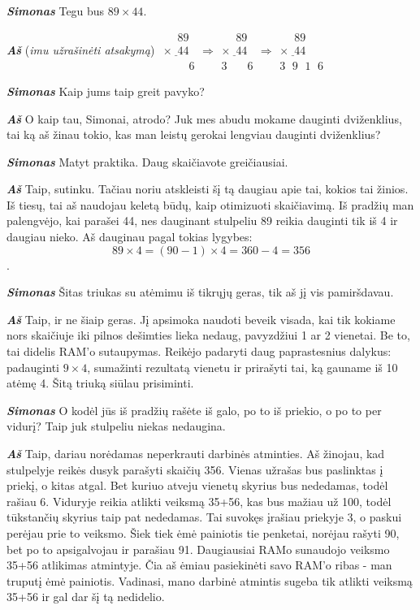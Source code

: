 \documentclass[a4paper]{article}
\newcommand{\say}[1]{\textbf{\textit{#1}}}
\begin{document}
\say{Simonas} Tegu bus $89 \times 44$.

\say{Aš} (\textit{imu užrašinėti atsakymą}) $\begin{array}{c}
\phantom{\times0}89\\
\underline{\times\phantom{0}44}\\
\phantom{\times044}6
\end{array} \Rightarrow 
\begin{array}{c}
\phantom{\times0}89\\
\underline{\times\phantom{0}44}\\
3\phantom{\times44}6
\end{array}\Rightarrow 
\begin{array}{c}
\phantom{\times0}89\\
\underline{\times\phantom{0}44}\\
3\phantom{\cdot}9\phantom{\cdot}1\phantom{\cdot}6
\end{array}$
 
\say{Simonas} Kaip jums taip greit pavyko?

\say{Aš} O kaip tau, Simonai, atrodo? Juk mes abudu mokame dauginti dviženklius, tai ką aš žinau tokio, kas man leistų gerokai lengviau dauginti dviženklius?

\say{Simonas} Matyt praktika. Daug skaičiavote greičiausiai. 

\say{Aš} Taip, sutinku. Tačiau noriu atskleisti šį tą daugiau apie tai, kokios tai žinios. Iš tiesų, tai aš naudojau keletą būdų, kaip otimizuoti skaičiavimą. Iš pradžių man palengvėjo, kai parašei 44, nes dauginant stulpeliu 89 reikia dauginti tik iš 4 ir daugiau nieko. Aš dauginau pagal tokias lygybes: $$89 \times 4 = (90-1) \times 4 = 360 - 4 = 356$$. 

\say{Simonas} Šitas triukas su atėmimu iš tikrųjų geras, tik aš jį vis pamiršdavau. 

\say{Aš} Taip, ir ne šiaip geras. Jį apsimoka naudoti beveik visada, kai tik kokiame nors skaičiuje iki pilnos dešimties lieka nedaug, pavyzdžiui 1 ar 2 vienetai. Be to, tai didelis RAM'o sutaupymas. Reikėjo padaryti daug paprastesnius dalykus: padauginti $9\times 4$, sumažinti rezultatą vienetu ir prirašyti tai, ką gauname iš 10 atėmę 4. Šitą triuką siūlau prisiminti. 

\say{Simonas} O kodėl jūs iš pradžių rašėte iš galo, po to iš priekio, o po to per vidurį? Taip juk stulpeliu niekas nedaugina.

\say{Aš} Taip, dariau norėdamas neperkrauti darbinės atminties. Aš žinojau, kad stulpelyje reikės dusyk parašyti skaičių 356. Vienas užrašas bus paslinktas į priekį, o kitas atgal. Bet kuriuo atveju vienetų skyrius bus nededamas, todėl rašiau 6. Viduryje reikia atlikti veiksmą 35+56, kas bus mažiau už 100, todėl tūkstančių skyrius taip pat nededamas. Tai suvokęs įrašiau priekyje 3, o paskui perėjau prie to veiksmo. Šiek tiek ėmė painiotis tie penketai, norėjau rašyti 90, bet po to apsigalvojau ir parašiau 91. Daugiausiai RAMo sunaudojo veiksmo 35+56 atlikimas atmintyje. Čia aš ėmiau pasiekinėti savo RAM'o ribas - man truputį ėmė painiotis. Vadinasi, mano darbinė atmintis sugeba tik atlikti veiksmą 35+56 ir gal dar šį tą nedidelio.
\end{document}
